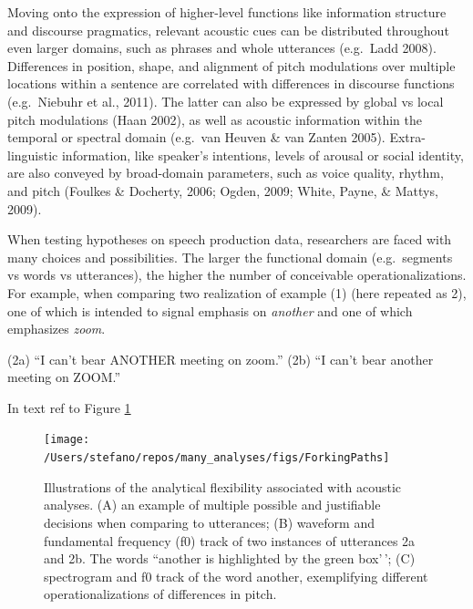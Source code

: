 \documentclass[
  english,
  man,floatsintext]{apa6}
\begin{document}
Moving onto the expression of higher-level functions like information structure and discourse pragmatics, relevant acoustic cues can be distributed throughout even larger domains, such as phrases and whole utterances (e.g.~Ladd 2008).
Differences in position, shape, and alignment of pitch modulations over multiple locations within a sentence are correlated with differences in discourse functions (e.g.~Niebuhr et al., 2011).
The latter can also be expressed by global vs local pitch modulations (Haan 2002), as well as acoustic information within the temporal or spectral domain (e.g.~van Heuven \& van Zanten 2005).
Extra-linguistic information, like speaker's intentions, levels of arousal or social identity, are also conveyed by broad-domain parameters, such as voice quality, rhythm, and pitch (Foulkes \& Docherty, 2006; Ogden, 2009; White, Payne, \& Mattys, 2009).

When testing hypotheses on speech production data, researchers are faced with many choices and possibilities.
The larger the functional domain (e.g.~segments vs words vs utterances), the higher the number of conceivable operationalizations.
For example, when comparing two realization of example (1) (here repeated as 2), one of which is intended to signal emphasis on \emph{another} and one of which emphasizes \emph{zoom}.

(2a) ``I can't bear ANOTHER meeting on zoom.''
(2b) ``I can't bear another meeting on ZOOM.''

In text ref to Figure \ref{fig:forkingPaths}



\begin{figure}
\texttt{[image: /Users/stefano/repos/many\_analyses/figs/ForkingPaths]} \caption{Illustrations of the analytical flexibility associated with acoustic analyses. (A) an example of multiple possible and justifiable decisions when comparing to utterances; (B) waveform and fundamental frequency (f0) track of two instances of utterances 2a and 2b. The words ``another is highlighted by the green box'\,'; (C) spectrogram and f0 track of the word another, exemplifying different operationalizations of differences in pitch.}\label{fig:forkingPaths}
\end{figure}
\end{document}
